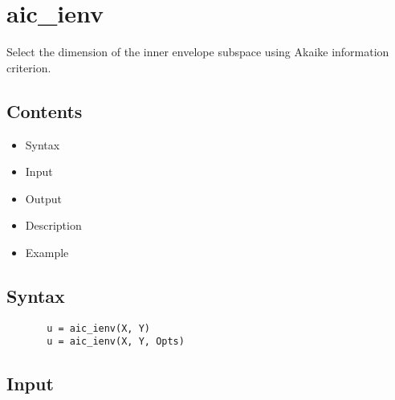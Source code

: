 \documentclass[a4paper,11pt,openany]{memoir}
\begin{document}
\rmfamily
\color{black}\section{aic\_ienv}

\begin{par}
Select the dimension of the inner envelope subspace using Akaike information criterion.
\end{par} \vspace{1em}

\subsection*{Contents}

\begin{itemize}
\setlength{\itemsep}{-1ex}
   \item Syntax
   \item Input
   \item Output
   \item Description
   \item Example
\end{itemize}


\subsection*{Syntax}


\begin{verbatim}       u = aic_ienv(X, Y)
       u = aic_ienv(X, Y, Opts)\end{verbatim}
    

\subsection*{Input}
\end{document}
